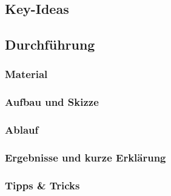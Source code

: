 

\subsection*{Key-Ideas}




\subsection*{Durchführung}

\subsubsection*{Material}




\subsubsection*{Aufbau und Skizze}




\subsubsection*{Ablauf}




\subsubsection*{Ergebnisse und kurze Erklärung}




\subsubsection*{Tipps \& Tricks}
